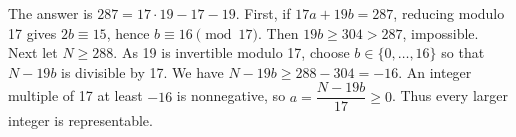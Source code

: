 The answer is $\boxed{287}=17\cdot19-17-19$. First, if $17a+19b=287$, reducing modulo 17 gives $2b\equiv15$, hence $b\equiv16\pmod{17}$. Then $19b\ge304>287$, impossible. Next let $N\ge288$. As 19 is invertible modulo 17, choose $b\in\{0,\ldots,16\}$ so that $N-19b$ is divisible by 17. We have $N-19b\ge288-304=-16$. An integer multiple of 17 at least $-16$ is nonnegative, so $a=\dfrac{N-19b}{17}\ge0$. Thus every larger integer is representable.
